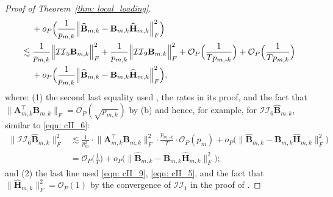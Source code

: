 \documentclass[aos]{imsart}
\theoremstyle{plain}
\theoremstyle{definition}
\def\wh#1{\widehat{#1}}
\def\cII{\mathcal{II}}
\def\cO{\mathcal{O}}
\def\bA{\mathbf{A}}
\def\bB{\mathbf{B}}
\def\bH{\mathbf{H}}
\def\trans{\intercal}
\begin{document}
\begin{proof}[Proof of Theorem~\ref{thm: local_loading}]
\begin{align}
    &\;\quad
    + o_P\Big( \frac{1}{p_{m,k}} \Big\| \wh{\bB}_{m,k} - \bB_{m,k} \wh{\bH}_{m,k} \Big\|_F^2 \Big) \notag \\
    &\lesssim
    \frac{1}{p_{m,k}} \Big\| \cII_5 \bB_{m,k} \Big\|_F^2 + \frac{1}{p_{m,k}} \Big\| \cII_9 \bB_{m,k} \Big\|_F^2 + \cO_P\Big( \frac{1}{T p_{m,\text{-}k}} \Big) + \cO_P\Big( \frac{1}{T p_{m,k}} \Big) \notag \\
    &\;\quad
    + o_P\Big( \frac{1}{p_{m,k}} \Big\| \wh{\bB}_{m,k} - \bB_{m,k} \wh{\bH}_{m,k} \Big\|_F^2 \Big) ,
    \label{eqn: hat_B_minus_BH}
\end{align}
where: (1) the second last equality used , the rates in its proof, and the fact that $\big\|\bA_{m,k}^\trans \bB_{m,k} \big\|_F =\cO_P(\sqrt{p_{m,k}})$ by (b) and hence, for example, for $\cII_6 \wh{\bB}_{m,k}$, similar to \eqref{eqn: cII_6}:
\begin{align*}
    \Big\| \cII_6 \wh{\bB}_{m,k} \Big\|_F^2 &\lesssim
    \frac{1}{p_m^2} \cdot \big\|\bA_{m,k}^\trans \bB_{m,k} \big\|_F^2 \cdot \frac{p_{m,\text{-}k}}{T} \cdot \cO_P(p_{m})
    + o_P\Big( \Big\| \wh{\bB}_{m,k} - \bB_{m,k} \wh{\bH}_{m,k} \Big\|_F^2 \Big) \\
    &=
    \cO_P\Big( \frac{1}{T} \Big) + o_P\Big( \Big\| \wh{\bB}_{m,k} - \bB_{m,k} \wh{\bH}_{m,k} \Big\|_F^2 \Big) ;
\end{align*}
and (2) the last line used \eqref{eqn: cII_9}, \eqref{eqn: cII_5}, and the fact that $\big\| \wh{\bH}_{m,k} \big\|_F^2 =\cO_P(1)$ by the convergence of $\cII_1$ in the proof of .





\end{proof}
\end{document}
